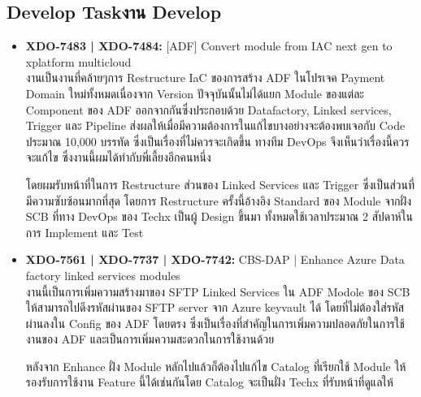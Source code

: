 \subsection{\ifenglish Develop Task\else งาน Develop\fi}
\begin{itemize}
      \item \textbf{XDO-7483 | XDO-7484:} [ADF] Convert module from IAC next gen to xplatform multicloud\\
            งานเป็นงานที่คล้ายๆการ Restructure IaC ของการสร้าง ADF ในโปรเจค Payment Domain ใหม่ทั้งหมดเนื่องจาก Version ปัจจุบันนั้นไม่ได้แยก Module ของแต่ละ Component ของ ADF ออกจากกันซึ่งประกอบด้วย Datafactory, Linked services, Trigger และ Pipeline ส่งผลให้เมื่อมีความต้องการในแก้ไขบางอย่างจะต้องพบเจอกับ Code ประมาณ 10,000 บรรทัด ซึ่งเป็นเรื่องที่ไม่ควรจะเกิดขึ้น ทางทีม DevOps จึงเห็นว่าเรื่องนี้ควรจะแก้ไข ซึ่งงานนี้ผมได้ทำกับพี่เลี้ยงอีกคนหนึ่ง 
            
            โดยผมรับหน้าที่ในการ Restructure ส่วนของ Linked Services และ Trigger ซึ่งเป็นส่วนที่มีความซับซ้อนมากที่สุด โดยการ Restructure ครั้งนี้อ้างอิง Standard ของ Module จากฝั่ง SCB ที่ทาง DevOps ของ Techx เป็นผู้ Design ขึ้นมา ทั้งหมดใช้เวลาประมาณ 2 สัปดาห์ในการ Implement และ Test
      \clearpage
      \item \textbf{XDO-7561 | XDO-7737 | XDO-7742:} CBS-DAP | Enhance Azure Data factory linked services modules\\
            งานนี้เป็นการเพิ่มความสร้างมาของ SFTP Linked Services ใน ADF Modole ของ SCB ให้สามารถไปดึงรหัสผ่านของ SFTP server จาก Azure keyvault ได้ โดยที่ไม่ต้องใส่รหัสผ่านลงใน Config ของ ADF โดยตรง ซึ่งเป็นเรื่องที่สำคัญในการเพิ่มความปลอดภัยในการใช้งานของ ADF และเป็นการเพิ่มความสะดวกในการใช้งานด้วย

            หลังจาก Enhance ฝั่ง Module หลักไปแล้วก็ต้องไปแก้ไข Catalog ที่เรียกใช้ Module ให้รองรับการใช้งาน Feature นี้ได้เช่นกันโดย Catalog จะเป็นฝั่ง Techx ที่รับหน้าที่ดูแลให้


\end{itemize}
